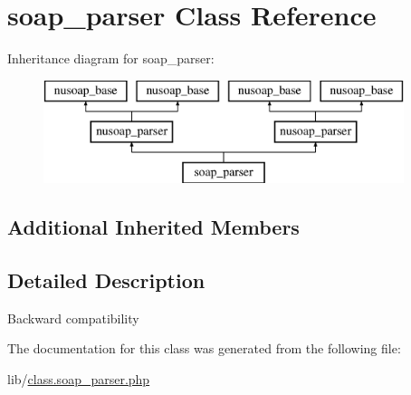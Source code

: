 \hypertarget{classsoap__parser}{}\section{soap\+\_\+parser Class Reference}
\label{classsoap__parser}
Inheritance diagram for soap\+\_\+parser\+:\begin{figure}[H]
\begin{center}
\leavevmode
\includegraphics[height=3.000000cm]{classsoap__parser}
\end{center}
\end{figure}
\subsection*{Additional Inherited Members}


\subsection{Detailed Description}
Backward compatibility 

The documentation for this class was generated from the following file\+:\begin{DoxyCompactItemize}
\item 
lib/\hyperlink{class_8soap__parser_8php}{class.\+soap\+\_\+parser.\+php}\end{DoxyCompactItemize}
